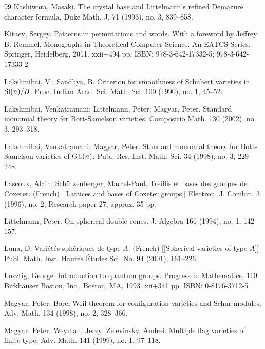 \documentclass[12pt]{amsart}
\theoremstyle{definition}
\theoremstyle{remark}
\begin{document}
\begin{thebibliography}{99}
Kashiwara, Masaki. The crystal base and Littelmann's refined Demazure character formula. Duke Math. J. 71 (1993), no. 3, 839--858.

Kitaev, Sergey. Patterns in permutations and words. With a foreword by Jeffrey B. Remmel. Monographs in Theoretical Computer Science. An EATCS Series. Springer, Heidelberg, 2011. xxii+494 pp. ISBN: 978-3-642-17332-5; 978-3-642-17333-2

Lakshmibai, V.; Sandhya, B. Criterion for smoothness of Schubert varieties in ${\rm Sl}(n)/B$. Proc. Indian Acad. Sci. Math. Sci. 100 (1990), no. 1, 45--52. 

Lakshmibai, Venkatramani; Littelmann, Peter; Magyar, Peter. Standard monomial theory for Bott-Samelson varieties. Compositio Math. 130 (2002), no. 3, 293--318.

Lakshmibai, Venkatramani; Magyar, Peter. Standard monomial theory for Bott-Samelson varieties of ${\rm GL}(n)$. Publ. Res. Inst. Math. Sci. 34 (1998), no. 3, 229--248.

Lascoux, Alain; Schützenberger, Marcel-Paul. Treillis et bases des groupes de Coxeter. (French) [[Lattices and bases of Coxeter groups]] Electron. J. Combin. 3 (1996), no. 2, Research paper 27, approx. 35 pp.

Littelmann, Peter. On spherical double cones. J. Algebra 166 (1994), no. 1, 142--157.

Luna, D. Variétés sphériques de type $A$. (French) [[Spherical varieties of type $A$]] Publ. Math. Inst. Hautes Études Sci. No. 94 (2001), 161--226.

Lusztig, George. Introduction to quantum groups. Progress in Mathematics, 110. Birkhäuser Boston, Inc., Boston, MA, 1993. {\rm xii}+341 pp. ISBN: 0-8176-3712-5

Magyar, Peter. Borel-Weil theorem for configuration varieties and Schur modules. Adv. Math. 134 (1998), no. 2, 328--366.

Magyar, Peter; Weyman, Jerzy; Zelevinsky, Andrei. Multiple flag varieties of finite type. Adv. Math. 141 (1999), no. 1, 97--118. 


\end{thebibliography}
\end{document}
